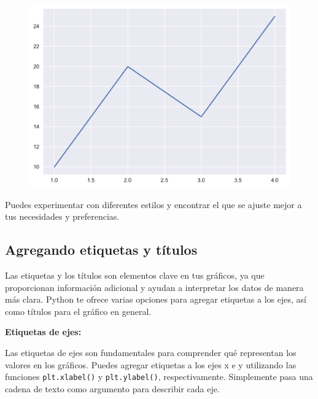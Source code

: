 \documentclass[
  a4paper,
]{article}
\begin{document}
\begin{figure}[H]

{\centering \includegraphics{index_files/figure-pdf/cell-8-output-1.pdf}

}

\end{figure}

Puedes experimentar con diferentes estilos y encontrar el que se ajuste
mejor a tus necesidades y preferencias.

\hypertarget{agregando-etiquetas-y-tuxedtulos}{%
\subsection{Agregando etiquetas y
títulos}\label{agregando-etiquetas-y-tuxedtulos}}

Las etiquetas y los títulos son elementos clave en tus gráficos, ya que
proporcionan información adicional y ayudan a interpretar los datos de
manera más clara. Python te ofrece varias opciones para agregar
etiquetas a los ejes, así como títulos para el gráfico en general.

\textbf{Etiquetas de ejes:}

Las etiquetas de ejes son fundamentales para comprender qué representan
los valores en los gráficos. Puedes agregar etiquetas a los ejes x e y
utilizando las funciones \texttt{plt.xlabel()} y \texttt{plt.ylabel()},
respectivamente. Simplemente pasa una cadena de texto como argumento
para describir cada eje.
\end{document}
